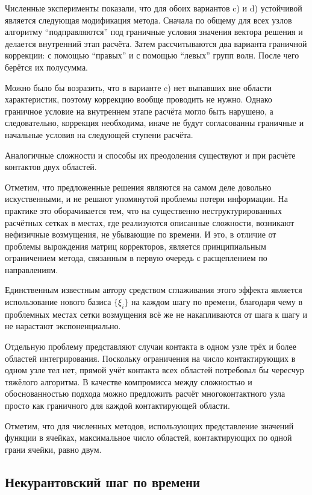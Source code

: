 \documentclass[a4paper]{article}
\numberwithin{equation}{section}
\begin{document}
Численные эксперименты показали, что для обоих вариантов c) и d) устойчивой является 
следующая модификация метода. 
Сначала по общему для всех узлов алгоритму ``подправляются'' под 
граничные условия значения вектора решения и делается внутренний этап расчёта. 
Затем рассчитываются два варианта граничной коррекции: с помощью ``правых'' и 
с помощью ``левых'' групп волн. После чего берётся их полусумма. 

Можно было бы возразить, что в варианте c) нет выпавших вне области характеристик, 
поэтому коррекцию вообще проводить не нужно. Однако граничное условие на внутреннем этапе расчёта 
могло быть нарушено, а следовательно, коррекция необходима, иначе не будут  
согласованны граничные и начальные условия на следующей ступени расчёта.

Аналогичные сложности и способы их преодоления существуют и при расчёте контактов двух областей. 

Отметим, что предложенные решения являются на самом деле довольно искуственными, 
и не решают упомянутой проблемы потери информации. На практике это оборачивается тем, 
что на существенно неструктурированных расчётных сетках в местах, где реализуются 
описанные сложности, возникают нефизичные возмущения, не убывающие по времени. 
И это, в отличие от проблемы вырождения матриц корректоров, является принципиальным 
ограничением метода, связанным в первую очередь с расщеплением по направлениям.

Единственным известным автору средством сглаживания этого эффекта является 
использование нового базиса $\{\xi_i\}$ на каждом шагу по времени, благодаря 
чему в проблемных местах сетки 
возмущения всё же не накапливаются от шага к шагу и не нарастают экспоненциально.

Отдельную проблему представляют случаи контакта в одном узле 
трёх и более областей интегрирования. Поскольку ограничения на 
число контактирующих в одном узле тел нет, 
прямой учёт контакта всех областей потребовал бы чересчур тяжёлого алгоритма. 
В качестве компромисса между сложностью и обоснованностью подхода можно предложить 
расчёт многоконтактного узла просто как граничного для каждой контактирующей области. 

Отметим, что для численных методов, использующих представление значений функции 
в ячейках, максимальное число областей, контактирующих по одной грани ячейки, равно двум. 


\subsection{Некурантовский шаг по времени}
\end{document}
